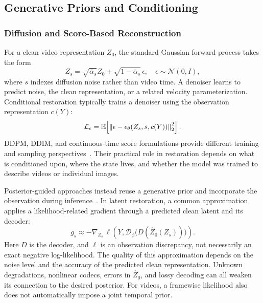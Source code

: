 \subsection{Generative Priors and Conditioning}
\label{sec:priors}
\subsubsection{Diffusion and Score-Based Reconstruction}
For a clean video representation $Z_0$, the standard Gaussian forward process takes the form
\begin{equation}
Z_s=\sqrt{\bar\alpha_s}Z_0+\sqrt{1-\bar\alpha_s}\,\epsilon,
\quad \epsilon\sim\mathcal N(0,I),
\end{equation}
where $s$ indexes diffusion noise rather than video time. A denoiser learns to predict noise, the clean representation, or a related velocity parameterization. Conditional restoration typically trains a denoiser using the observation representation $c(Y)$:
\begin{equation}
\mathcal L_{\epsilon}=\mathbb{E}\!\left[\left\|\epsilon-\epsilon_\theta(Z_s,s,c(Y))\right\|_2^2\right].
\end{equation}
DDPM, DDIM, and continuous-time score formulations provide different training and sampling perspectives~\cite{ddpm,ddim,score_sde}. Their practical role in restoration depends on what is conditioned upon, where the state lives, and whether the model was trained to describe videos or individual images.

Posterior-guided approaches instead reuse a generative prior and incorporate the observation during inference~\cite{ddrm,dps}. In latent restoration, a common approximation applies a likelihood-related gradient through a predicted clean latent and its decoder:
\begin{equation}
g_s \approx -\nabla_{Z_s}\,\ell\!\left(Y,\mathcal D_{\phi}\bigl(D(\widehat Z_0(Z_s))\bigr)\right).
\label{eq:guidance}
\end{equation}
Here $D$ is the decoder, and $\ell$ is an observation discrepancy, not necessarily an exact negative log-likelihood. The quality of this approximation depends on the noise level and the accuracy of the predicted clean representation. Unknown degradations, nonlinear codecs, errors in $\widehat Z_0$, and lossy decoding can all weaken its connection to the desired posterior. For videos, a framewise likelihood also does not automatically impose a joint temporal prior.

